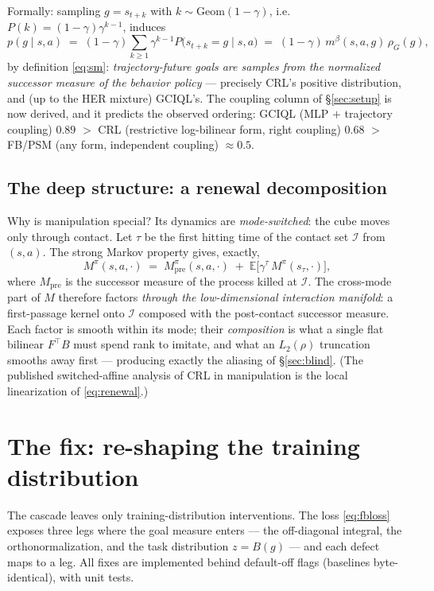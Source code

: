 \documentclass[11pt,a4paper]{article}
\newcommand{\E}{\mathbb{E}}
\begin{document}
Formally: sampling $g=s_{t+k}$ with $k\sim\mathrm{Geom}(1-\gamma)$, i.e.
$P(k)=(1-\gamma)\gamma^{k-1}$, induces
\begin{equation}
p(g\mid s,a)\;=\;(1-\gamma)\sum_{k\ge1}\gamma^{k-1}P\big(s_{t+k}=g\mid s,a\big)
\;=\;(1-\gamma)\,m^{\beta}(s,a,g)\,\rho_G(g),
\label{eq:coupling}
\end{equation}
by definition \eqref{eq:sm}: \emph{trajectory-future goals are samples from the normalized
successor measure of the behavior policy} --- precisely CRL's positive distribution, and (up to
the HER mixture) GCIQL's. The coupling column of \S\ref{sec:setup} is now derived, and it predicts
the observed ordering: GCIQL (MLP $+$ trajectory coupling) $0.89$ $>$ CRL (restrictive log-bilinear
form, right coupling) $0.68$ $>$ FB/PSM (any form, independent coupling) $\approx0.5$.

\subsection{The deep structure: a renewal decomposition}\label{sec:renewal}
Why is manipulation special? Its dynamics are \emph{mode-switched}: the cube moves only through
contact. Let $\tau$ be the first hitting time of the contact set $\mathcal{I}$ from $(s,a)$. The
strong Markov property gives, exactly,
\begin{equation}
M^{\pi}(s,a,\cdot)\;=\;M^{\pi}_{\mathrm{pre}}(s,a,\cdot)\;+\;\E\big[\gamma^{\tau}\,M^{\pi}(s_{\tau},\cdot)\big],
\label{eq:renewal}
\end{equation}
where $M_{\mathrm{pre}}$ is the successor measure of the process killed at $\mathcal{I}$. The
cross-mode part of $M$ therefore factors \emph{through the low-dimensional interaction manifold}:
a first-passage kernel onto $\mathcal{I}$ composed with the post-contact successor measure. Each
factor is smooth within its mode; their \emph{composition} is what a single flat bilinear
$F^{\top}B$ must spend rank to imitate, and what an $L_2(\rho)$ truncation smooths away first ---
producing exactly the aliasing of \S\ref{sec:blind}. (The published switched-affine analysis of
CRL in manipulation is the local linearization of \eqref{eq:renewal}.)

\section{The fix: re-shaping the training distribution}\label{sec:fix}

The cascade leaves only training-distribution interventions. The loss \eqref{eq:fbloss} exposes
three legs where the goal measure enters --- the off-diagonal integral, the orthonormalization,
and the task distribution $z=B(g)$ --- and each defect maps to a leg. All fixes are implemented
behind default-off flags (baselines byte-identical), with unit tests.
\end{document}
